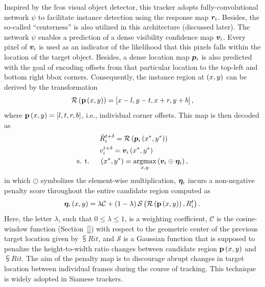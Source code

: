 Inspired by the \gls{fcos} visual object detector, this tracker adopts fully-convolutional network $\psi$ to facilitate instance detection using the response map $\bm{r}_{i}$. Besides, the so-called ``centerness'' is also utilized in this architecture (discussed later). The network $\psi$ enables a prediction of a dense visibility confidence map $\bm{v}_{i}$. Every pixel of $\bm{v}_{i}$ is used as an indicator of the likelihood that this pixels falls within the location of the target object. Besides, a dense location map $\bm{p}_{i}$ is also predicted with the goal of encoding offsets from that particular location to the top-left and bottom right \gls{bbox} corners. Consequently, the instance region at $\left( {x, y} \right)$ can be derived by the transformation
\begin{equation}
    {\mathcal{R}} \left( {\mathbf{p}} \left( x, y \right) \right) =
    \left[ {x - l, y - t, x + r, y + b} \right],
\end{equation}
where ${\mathbf{p}} \left( x, y \right) = \left[ {l, t, r, b} \right]$, i.e., individual corner offsets. This map is then decoded as
\begin{equation}
    \begin{aligned}
        &{\tilde{R}}_{i}^{t + \delta} =
        {\mathcal{R}} \left( {\bm{p}_{i}} \left( x^*, y^* \right) \right)\\
        &{v}_{i}^{t + \delta} = {\bm{v}_{i}} \left( x^*, y^* \right)\\
        \text{s. t. } \quad &\left( {x^*, y^*} \right) = \underset{x, y}{\text{argmax}} \left( {\bm{v}_{i} \odot \bm{\eta}_{i}} \right),
    \end{aligned}
\end{equation}
in which $\odot$ symbolizes the element-wise multiplication, $\bm{\eta}_{i}$ incurs a non-negative penalty score throughout the entire candidate region computed as
\begin{equation}
    {\bm{\eta}_{i}} \left( x, y \right) =
    \lambda \mathcal{C} +
    \left( {1 - \lambda} \right) {\mathcal{S}} \left( 
        {\mathcal{R}} \left( 
            {\mathbf{p}} \left( x, y \right)
         \right),
        {R}_{i}^{t}
     \right).
\end{equation}
Here, the letter $\lambda$, such that $0 \leq \lambda \leq 1$, is a weighting coefficient, $\mathcal{C}$ is the cosine-window function (Section~\ref{}) with respect to the geometric center of the previous target location given by $\subsup{R}{i}{t}$, and $\mathcal{S}$ is a Gaussian function that is supposed to penalize the height-to-width ratio changes between candidate region ${\mathbf{p}} \left( x, y \right)$ and $\subsup{R}{i}{t}$. The aim of the penalty map is to discourage abrupt changes in target location between individual frames during the course of tracking. This technique is widely adopted in Siamese trackers.

